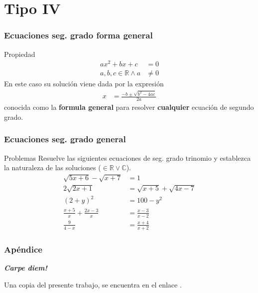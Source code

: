 \documentclass[12pt,spanish,x11names]{beamer}
\def\talktitle{Métodos de Resolución}
\def\talkpubpdf{https://github.com/hsigrist/LMLA/blob/master/3TP/TALKS/ECUACION-SEGUNDO-GRADO-3TP.pdf}
\def\RR{\mathbb{R}}
\def\CC{\mathbb{C}}
\newcommand{\framedhref}[2]{\href{#1}{\fcolorbox{bluu}{bluu}{\textcolor{white}{#2}}}}
\begin{document}
\section{Tipo IV}
\begin{frame}
  \frametitle{Ecuaciones seg. grado forma general}
  \begin{block}{Propiedad}
    \begin{align*}
      ax^2+bx+c&=0\\
      a,b,c\in\RR\wedge a&\neq0
    \end{align*}
    En este caso su solución viene dada por la expresión
    \begin{align*}
      x&=\frac{-b\pm\sqrt{b^2-4ac}}{2a}
    \end{align*}
    conocida como la \textbf{formula general} para resolver \textbf{cualquier}
    ecuación de segundo grado.
  \end{block}
\end{frame}
\begin{frame}
  \frametitle{Ecuaciones seg. grado general}
  \begin{exampleblock}{Problemas}
    Resuelve las siguientes ecuaciones de seg. grado trinomio y establezca la
    naturaleza de las soluciones ($\in\RR\vee\CC$).
    \begin{align}
      \sqrt{5x+6}-\sqrt{x+7}&=1\\
      2\sqrt{2x+1}&=\sqrt{x+5}+\sqrt{4x-7}\\
      (2+y)^2&=100-y^2\\
      \frac{x+5}{x}+\frac{2x-3}{x}&=\frac{x-3}{x-2}\\
      \frac{9}{4-x}&=\frac{x+4}{x+2}
    \end{align}
  \end{exampleblock}
\end{frame}






\begin{frame}[c]\frametitle{Apéndice}
\centering\decofourleft\quad\decofourright

\textbf{\emph {Carpe diem!}}

Una copia del presente trabajo, se encuentra en el enlace \framedhref{\talkpubpdf}{\talktitle}.

\end{frame}
\end{document}

